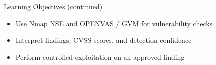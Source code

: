 \begin{frame}[t]{Learning Objectives (continued)}
  \begin{itemize}
    \setlength{\itemsep}{0.2cm}
    \item Use Nmap NSE and OPENVAS / GVM for vulnerability checks
    \item Interpret findings, CVSS scores, and detection confidence
    \item Perform controlled exploitation on an approved finding
  \end{itemize}
\end{frame}

